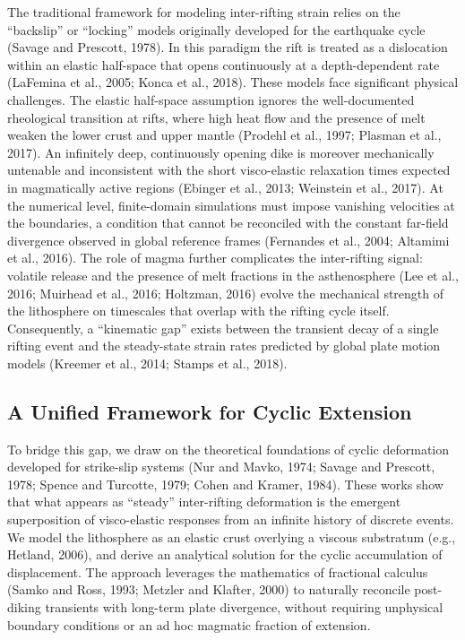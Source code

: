\documentclass{article}
\begin{document}
The traditional framework for modeling inter-rifting strain relies on the
``backslip'' or ``locking'' models originally developed for the earthquake
cycle (Savage and Prescott, 1978). In this paradigm the rift is treated as a
dislocation within an elastic half-space that opens continuously at a
depth-dependent rate (LaFemina et al., 2005; Konca et al., 2018). These models
face significant physical challenges. The elastic half-space assumption ignores
the well-documented rheological transition at rifts, where high heat flow and
the presence of melt weaken the lower crust and upper mantle (Prodehl et al.,
1997; Plasman et al., 2017). An infinitely deep, continuously opening dike is
moreover mechanically untenable and inconsistent with the short visco-elastic
relaxation times expected in magmatically active regions (Ebinger et al.,
2013; Weinstein et al., 2017). At the numerical level, finite-domain
simulations must impose vanishing velocities at the boundaries, a condition
that cannot be reconciled with the constant far-field divergence observed in
global reference frames (Fernandes et al., 2004; Altamimi et al., 2016).
The role of magma further complicates the inter-rifting signal: volatile
release and the presence of melt fractions in the asthenosphere (Lee et al.,
2016; Muirhead et al., 2016; Holtzman, 2016) evolve the mechanical strength of
the lithosphere on timescales that overlap with the rifting cycle itself.
Consequently, a ``kinematic gap'' exists between the transient decay of a
single rifting event and the steady-state strain rates predicted by global
plate motion models (Kreemer et al., 2014; Stamps et al., 2018).

\subsection{A Unified Framework for Cyclic Extension}

To bridge this gap, we draw on the theoretical foundations of cyclic
deformation developed for strike-slip systems (Nur and Mavko, 1974; Savage
and Prescott, 1978; Spence and Turcotte, 1979; Cohen and Kramer, 1984). These
works show that what appears as ``steady'' inter-rifting deformation is the
emergent superposition of visco-elastic responses from an infinite history of
discrete events. We model the lithosphere as an elastic crust overlying a
viscous substratum (e.g., Hetland, 2006), and derive an analytical solution
for the cyclic accumulation of displacement. The approach leverages the
mathematics of fractional calculus (Samko and Ross, 1993; Metzler and Klafter,
2000) to naturally reconcile post-diking transients with long-term plate
divergence, without requiring unphysical boundary conditions or an ad hoc
magmatic fraction of extension.
\end{document}
